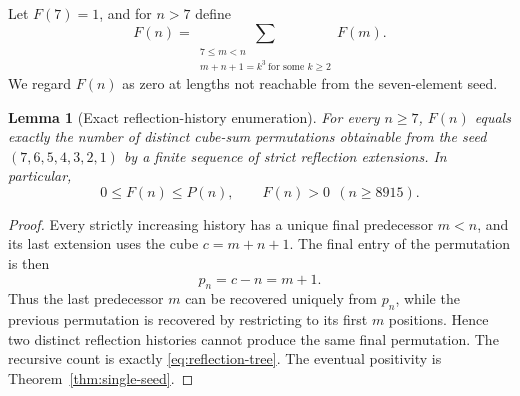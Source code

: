 \documentclass[10pt]{article}
\newtheorem{lemma}{Lemma}
\begin{document}
Let $F(7)=1$, and for $n>7$ define
\begin{equation}\label{eq:reflection-tree}
\boxed{\displaystyle
F(n)=
\sum_{\substack{7\le m<n\\m+n+1=k^3\ \text{for some }k\ge2}}
F(m).}
\end{equation}
We regard $F(n)$ as zero at lengths not
reachable from the seven-element seed.

\begin{lemma}[Exact reflection-history enumeration]
\label{lem:reflection-count}
For every $n\ge7$, $F(n)$ equals exactly
the number of distinct cube-sum permutations
obtainable from the seed
$(7,6,5,4,3,2,1)$ by a finite sequence
of strict reflection extensions.
In particular,
\[
\boxed{0\le F(n)\le P(n),\qquad
F(n)>0\ \ (n\ge8915).}
\]
\end{lemma}
\begin{proof}
Every strictly increasing history has
a unique final predecessor $m<n$,
and its last extension uses the cube
$c=m+n+1$. The final entry of the
permutation is then
\[
p_n=c-n=m+1.
\]
Thus the last predecessor $m$ can be
recovered uniquely from $p_n$, while
the previous permutation is recovered
by restricting to its first $m$
positions. Hence two distinct
reflection histories cannot produce
the same final permutation.
The recursive count is exactly
\eqref{eq:reflection-tree}.
The eventual positivity is
Theorem~\ref{thm:single-seed}.
\end{proof}
\end{document}
